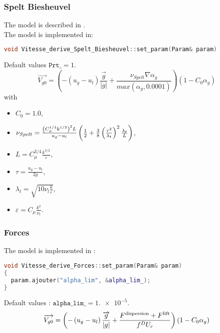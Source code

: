 \subsubsection{Spelt Biesheuvel}
The model is described in \cite{Spelt1997}.\\
The model is implemented in:
\begin{lstlisting}[language=c++]
void Vitesse_derive_Spelt_Biesheuvel::set_param(Param& param)
\end{lstlisting}
Default values  $\texttt{Prt\_} = 1.$\\
\begin{equation}
  \vec{V_{g0}} =(-(u_g-u_l)\frac{\vec{g}}{|g|}+\frac{\nu_{Spelt}\nabla \alpha_g}{max(\alpha_g,0.0001)})(1-C_0\alpha_g)
\end{equation}
with
\begin{itemize}
    \item[\small \textcolor{blue}{\ding{109}}] $C_0=1.0$,
    \item[\small \textcolor{blue}{\ding{109}}]$\nu_{Spelt}=\frac{\left( C_\mu^{1/4}k^{1/2} \right)^2L }{u_g-u_l}\left( \frac{1}{2}+\frac{3}{8}\left( \frac{\tau^2}{\lambda_t} \right)^2\frac{\lambda_t}{L} \right)$,
    \item[\small \textcolor{blue}{\ding{109}}]$L=C_\mu^{3/4}\frac{k^{3/2}}{\varepsilon}$,
    \item[\small \textcolor{blue}{\ding{109}}]$\tau=\frac{u_g-u_l}{2g}$,
    \item[\small \textcolor{blue}{\ding{109}}]$\lambda_t=\sqrt{10\nu_l\frac{k}{\varepsilon}}$,
    \item[\small \textcolor{blue}{\ding{109}}]$\varepsilon=C_\mu \frac{k^2}{\nu_t}$.

\end{itemize}

\subsubsection{Forces}
The model is implemented in :
\begin{lstlisting}[language=c++]
void Vitesse_derive_Forces::set_param(Param& param)
{
  param.ajouter("alpha_lim", &alpha_lim_);
}
\end{lstlisting}
Default values : $\texttt{alpha\_lim\_}=\num{1.e-5}$.\\
\begin{equation}
  \overrightarrow{V_{g0}} =\left( -\left( u_g-u_l \right)\frac{\overrightarrow{g}}{|g|}+\frac{F^{\text{dispersion}}+F^{\text{lift}}}{f^DU_r} \right)\left( 1-C_0\alpha_g \right)
\end{equation}

